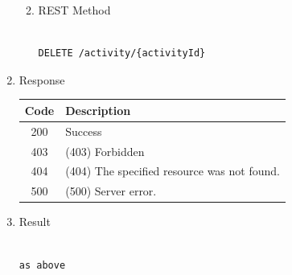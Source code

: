 \begin{enumerate}
\begin{enumerate}
\begin{table}[H]
\begin{center}
\begin{tabular}{|p{3cm}|l|p{3cm}|p{3cm}|p{4cm}|}

\end{tabular}
\end{center}
\end{table}


\item REST Method

\begin{tcolorbox}[boxrule=0pt, frame empty]
\begin{verbatim} 

DELETE /activity/{activityId}

\end{verbatim}
\end{tcolorbox}

\end{enumerate}

\item Response

\begin{table}[H]
\footnotesize

\begin{center}
\begin{tabular}{|c|l|} 
\hline
\rowcolor{lightgray}	Code 		& 	Description \\
\hline
200	 		&	Success \\
\hline
403			&	(403) Forbidden	\\
\hline
404			&	(404) The specified resource was not found. \\
\hline
500			&	(500) Server error. \\
\hline
\end{tabular}
\end{center}
\end{table}

\item Result

\begin{tcolorbox}[boxrule=0pt, frame empty]
\begin{verbatim}

as above

\end{verbatim}
\end{tcolorbox}



\end{enumerate}
